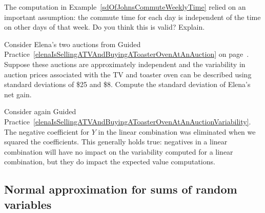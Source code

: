\begin{exercisewrap}
\begin{nexercise}
The computation in Example~\ref{sdOfJohnsCommuteWeeklyTime} relied on an important assumption: the commute time for each day is independent of the time on other days of that week. Do you think this is valid? Explain.\footnotemark
\end{nexercise}
\end{exercisewrap}

\begin{exercisewrap}
\begin{nexercise}\label{elenaIsSellingATVAndBuyingAToasterOvenAtAnAuctionVariability}
Consider Elena's two auctions from Guided Practice~\ref{elenaIsSellingATVAndBuyingAToasterOvenAtAnAuction} on page~\pageref{elenaIsSellingATVAndBuyingAToasterOvenAtAnAuction}. Suppose these auctions are approximately independent and the variability in auction prices associated with the TV and toaster oven can be described using standard deviations of \$25 and \$8. Compute the standard deviation of Elena's net gain.\footnotemark
\end{nexercise}
\end{exercisewrap}

Consider again Guided Practice~\ref{elenaIsSellingATVAndBuyingAToasterOvenAtAnAuctionVariability}. The negative coefficient for $Y$ in the linear combination was eliminated when we squared the coefficients. This generally holds true: negatives in a linear combination will have no impact on the variability computed for a linear combination, but they do impact the expected value computations.


\D{\newpage}

\subsection{Normal approximation for sums of random variables}
\label{normapproxsumrv}

